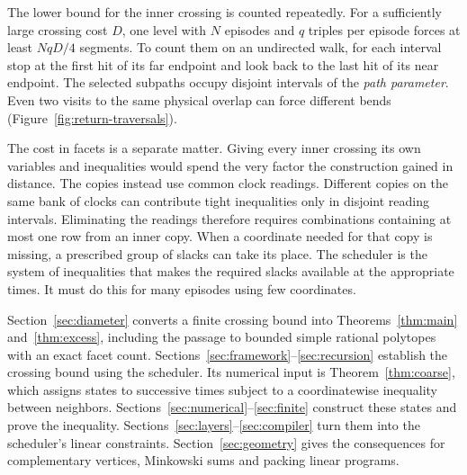 The lower bound for the inner crossing is counted repeatedly. For a
sufficiently large crossing cost \(D\), one level with \(N\) episodes
and \(q\) triples per episode forces at least \(NqD/4\) segments. To count them
on an undirected walk, for each interval stop at the first hit of its
far endpoint and look back to the last hit of its near endpoint. The
selected subpaths occupy disjoint intervals of the \emph{path parameter}.
Even two visits to the same physical overlap can force different bends
(Figure~\ref{fig:return-traversals}).

The cost in facets is a separate matter. Giving every inner crossing
its own variables and inequalities would spend the very factor the
construction gained in distance. The copies instead use common clock
readings. Different copies on the same bank of clocks can contribute
tight inequalities only in disjoint reading intervals. Eliminating the
readings therefore requires combinations containing at most one row
from an inner copy. When a coordinate needed for that copy is missing,
a prescribed group of slacks can take its place. The scheduler is the
system of inequalities that makes the required slacks available at
the appropriate times. It must do this for many episodes using few
coordinates.

Section~\ref{sec:diameter} converts a finite crossing bound into
Theorems~\ref{thm:main} and~\ref{thm:excess}, including the passage
to bounded simple rational polytopes with an exact facet count.
Sections~\ref{sec:framework}--\ref{sec:recursion} establish the crossing
bound using the scheduler. Its numerical input is Theorem~\ref{thm:coarse},
which assigns states to successive times subject to a coordinatewise
inequality between neighbors. Sections~\ref{sec:numerical}--\ref{sec:finite}
construct these states and prove the inequality.
Sections~\ref{sec:layers}--\ref{sec:compiler} turn them into the scheduler's
linear constraints. Section~\ref{sec:geometry} gives the consequences
for complementary vertices, Minkowski sums and packing linear programs.
